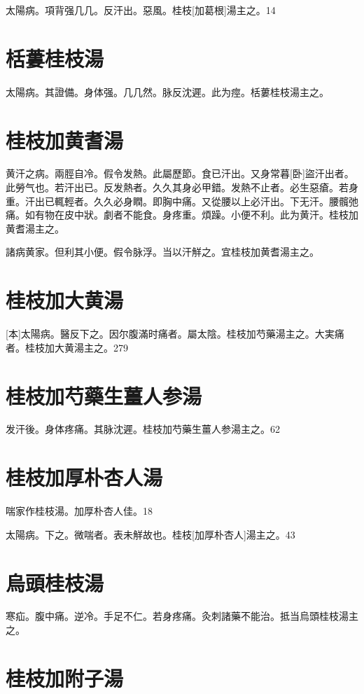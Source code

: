 \documentclass[12pt,oneside,UTF8,b5paper]{ctexbook}她她她她她她她
\begin{document}
太陽病。項背强几几。反汗出。惡風。桂枝[加葛根]湯主之。14

\section{栝蔞桂枝湯}

太陽病。其證備。身体强。几几然。脉反沈遲。此为痙。栝蔞桂枝湯主之。

\section{桂枝加黄耆湯}

黄汗之病。兩脛自冷。假令发熱。此屬歷節。食已汗出。又身常暮[卧]盜汗出者。此勞气也。若汗出已。反发熱者。久久其身必甲錯。发熱不止者。必生惡瘡。若身重。汗出已輒輕者。久久必身瞤。即胸中痛。又從腰以上必汗出。下无汗。腰髖弛痛。如有物在皮中狀。劇者不能食。身疼重。煩躁。小便不利。此为黄汗。桂枝加黄耆湯主之。

諸病黄家。但利其小便。假令脉浮。当以汗觧之。宜桂枝加黄耆湯主之。

\section{桂枝加大黄湯}

[本]太陽病。醫反下之。因尔腹滿时痛者。屬太陰。桂枝加芍藥湯主之。大実痛者。桂枝加大黄湯主之。279

\section{桂枝加芍藥生薑人参湯}

发汗後。身体疼痛。其脉沈遲。桂枝加芍藥生薑人参湯主之。62

\section{桂枝加厚朴杏人湯}

喘家作桂枝湯。加厚朴杏人佳。18

太陽病。下之。微喘者。表未觧故也。桂枝[加厚朴杏人]湯主之。43

\section{烏頭桂枝湯}

寒疝。腹中痛。逆冷。手足不仁。若身疼痛。灸刺諸藥不能治。抵当烏頭桂枝湯主之。

\section{桂枝加附子湯}
\end{document}
